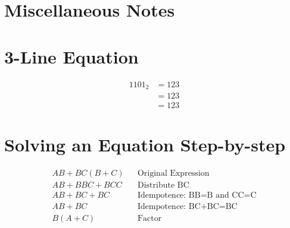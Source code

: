 \section{Miscellaneous Notes}






\section{3-Line Equation}
\begin{align}
	\label{03:eq:identity_example}
	1101_2 &= 123 \\
	\nonumber
	&= 123 \\
	\nonumber
	&= 123
\end{align}


\section{Solving an Equation Step-by-step}
\begin{align}
	\label{04:soln:solving_equation_one}
	AB+BC(B+C) && \text{Original Expression} \\
	\nonumber
	AB+BBC+BCC && \text{Distribute BC} \\
	\nonumber
	AB+BC+BC && \text{Idempotence: BB=B and CC=C} \\
	\nonumber
	AB+BC && \text{Idempotence: BC+BC=BC} \\
	\nonumber
	B(A+C) && \text{Factor} \\
\end{align}

